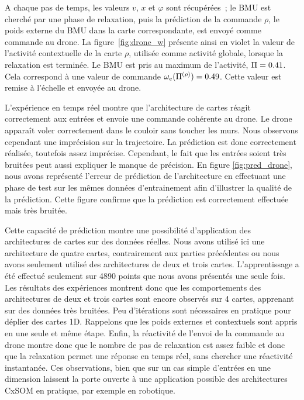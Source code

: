 \documentclass[../main]{subfiles}
\begin{document}
A chaque pas de temps, les valeurs $v$, $x$ et $\varphi$ sont récupérées~; le BMU est cherché par une phase de relaxation, puis la prédiction de la commande $\rho$, le poids externe du BMU dans la carte correspondante, est envoyé comme commande au drone.
La figure~\ref{fig:drone_w} présente ainsi en violet la valeur de l'activité contextuelle de la carte $\rho$, utilisée comme activité globale, lorsque la relaxation est terminée. Le BMU est pris au maximum de l'activité, $\Pi = 0.41$. Cela correspond à une valeur de commande $\omega_e(\Pi^{({\rho})}) = 0.49$. Cette valeur est remise à l'échelle et envoyée au drone.

L'expérience en temps réel montre que l'architecture de cartes réagit correctement aux entrées et envoie une commande cohérente au drone. Le drone apparaît voler correctement dans le couloir sans toucher les murs. Nous observons cependant une imprécision sur la trajectoire. La prédiction est donc correctement réalisée, toutefois assez imprécise. Cependant, le fait que les entrées soient très bruitées peut aussi expliquer le manque de précision. 
En figure \ref{fig:pred_drone}, nous avons représenté l'erreur de prédiction de l'architecture en effectuant une phase de test sur les mêmes données d'entrainement afin d'illustrer la qualité de la prédiction. Cette figure confirme que la prédiction est correctement effectuée mais très bruitée.

Cette capacité de prédiction montre une possibilité d'application des architectures de cartes sur des données réelles. Nous avons utilisé ici une architecture de quatre cartes, contrairement aux parties précédentes ou nous avons seulement utilisé des architectures de deux et trois cartes. 
L'apprentissage a été effectué seulement sur 4890 points que nous avons présentés une seule fois.
Les résultats des expériences montrent donc que les comportements des architectures de deux et trois cartes sont encore observés sur 4 cartes, apprenant sur des données très bruitées.
Peu d'itérations sont nécessaires en pratique pour déplier des cartes 1D. Rappelons que les poids externes et contextuels sont appris en une seule et même étape.
Enfin, la réactivité de l'envoi de la commande au drone montre donc que le nombre de pas de relaxation est assez faible et donc que la relaxation permet une réponse en temps réel, sans chercher une réactivité instantanée.
Ces observations, bien que sur un cas simple d'entrées en une dimension laissent la porte ouverte à une application possible des architectures CxSOM en pratique, par exemple en robotique.
\end{document}

